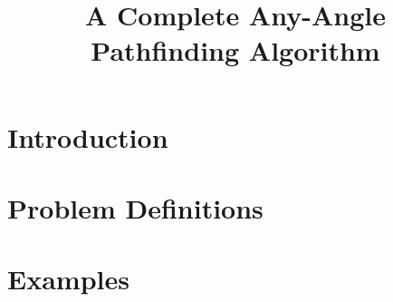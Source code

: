 \documentclass{article}
\begin{document}
\title{A Complete Any-Angle Pathfinding Algorithm}
\maketitle

\section{Introduction}


\section{Problem Definitions}


\section{Examples}

\end{document}
